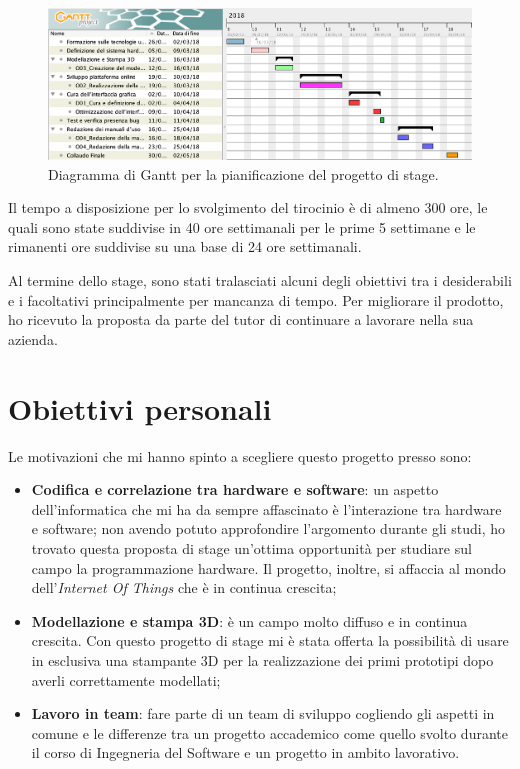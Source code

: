 \begin{figure}[H]
	\begin{center}
	\includegraphics[scale=0.4]{immagini/gantt.png}
	\caption{Diagramma di Gantt per la pianificazione del progetto di stage.}
	\end{center}
\end{figure}

Il tempo a disposizione per lo svolgimento del tirocinio è di almeno 300 ore, le quali sono state suddivise in 40 ore settimanali per le prime 5 settimane e le rimanenti ore suddivise su una base di 24 ore settimanali.

\medskip

Al termine dello stage, sono stati tralasciati alcuni degli obiettivi tra i desiderabili e i facoltativi principalmente per mancanza di tempo.
Per migliorare il prodotto, ho ricevuto la proposta da parte del tutor di continuare a lavorare nella sua azienda.

\section{Obiettivi personali}
Le motivazioni che mi hanno spinto a scegliere questo progetto presso \lab{} sono:

\begin{itemize}
\item \textbf{Codifica e correlazione tra hardware e software}: un aspetto dell'informatica che mi ha da sempre affascinato è l'interazione tra hardware e software; non avendo potuto approfondire l'argomento durante gli studi, ho trovato questa proposta di stage un'ottima opportunità per studiare sul campo la programmazione hardware. Il progetto, inoltre, si affaccia al mondo dell'\textit{Internet Of Things} che è in continua crescita;
\item \textbf{Modellazione e stampa 3D}: è un campo molto diffuso e in continua crescita. Con questo progetto di stage mi è stata offerta la possibilità di usare in esclusiva una stampante 3D per la realizzazione dei primi prototipi dopo averli correttamente modellati;
\item \textbf{Lavoro in team}: fare parte di un team di sviluppo cogliendo gli aspetti in comune e le differenze tra un progetto accademico come quello svolto durante il corso di Ingegneria del Software e un progetto in ambito lavorativo. 
\end{itemize}

